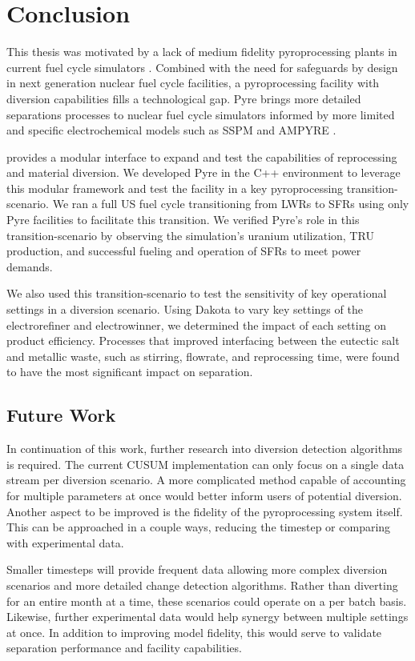 \chapter{Conclusion}

This thesis was motivated by a lack of medium fidelity pyroprocessing plants in current fuel cycle simulators \cite{borrelli_approaches_2017}. Combined with 
the need for safeguards by design in next generation nuclear fuel cycle facilities, a pyroprocessing facility with diversion capabilities fills a technological gap.
Pyre brings more detailed separations processes to nuclear fuel cycle simulators informed by more limited and specific electrochemical models such as SSPM and AMPYRE \cite{maggos_update_2015,cipiti_modeling_2012}.

\Cyclus provides a modular interface to expand and test the capabilities of reprocessing and material diversion. We developed Pyre in the C++ \Cyclus environment to leverage this
modular framework and test the facility in a key pyroprocessing transition-scenario. We ran a full US fuel cycle transitioning from LWRs to SFRs using only Pyre facilities to facilitate
this transition. We verified Pyre's role in this transition-scenario by observing the simulation's uranium utilization, TRU production, and successful fueling and operation of SFRs to
meet power demands.

We also used this transition-scenario to test the sensitivity of key operational settings in a diversion scenario. Using Dakota to vary key settings of the electrorefiner and electrowinner, we
determined the impact of each setting on product efficiency. Processes that improved interfacing between the eutectic salt and metallic waste, such as stirring, flowrate, and reprocessing time, 
were found to have the most significant impact on separation. 

\newpage

\section{Future Work}

In continuation of this work, further research into diversion detection algorithms is required. The current CUSUM implementation can only focus on a single data stream per diversion scenario.
A more complicated method capable of accounting for multiple parameters at once would better inform users of potential diversion. Another aspect to be improved is the fidelity of the
pyroprocessing system itself. This can be approached in a couple ways, reducing the timestep or comparing with experimental data. 

Smaller timesteps will provide frequent data allowing more complex diversion scenarios and more detailed change detection algorithms. Rather than diverting for an entire month at a time,
these scenarios could operate on a per batch basis. Likewise, further experimental data would help synergy between multiple settings at once. In addition to improving model fidelity,
this would serve to validate separation performance and facility capabilities.  